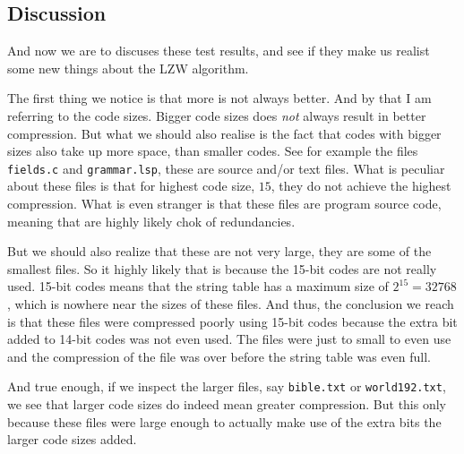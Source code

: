 \begin{refsection}
\subsection{Discussion}

And now we are to discuses these test results, and see if they make us
realist some new things about the LZW algorithm.

The first thing we notice is that more is not always better. And by
that I am referring to the code sizes. Bigger code sizes does
\textit{not} always result in better compression. But what we should
also realise is the fact that codes with bigger sizes also take up
more space, than smaller codes. See for example the files
\verb|fields.c| and \verb|grammar.lsp|, these are source and/or text
files. What is peculiar about these files is that for highest code
size, $15$, they do not achieve the highest compression. What is even
stranger is that these files are program source code, meaning that are
highly likely chok of redundancies.

But we should also realize that these are not very large, they are
some of the smallest files. So it highly likely that is because the
15-bit codes are not really used. 15-bit codes means that the string
table has a maximum size of $2^{15} = 32768$, which is nowhere near
the sizes of these files. And thus, the conclusion we reach is that
these files were compressed poorly using 15-bit codes because the
extra bit added to 14-bit codes was not even used. The files were just
to small to even use and the compression of the file was over before
the string table was even full.

And true enough, if we inspect the larger files, say \verb|bible.txt|
or \verb|world192.txt|, we see that larger code sizes do indeed mean
greater compression. But this only because these files were large
enough to actually make use of the extra bits the larger code sizes
added.

\FloatBarrier

\printbibliography[heading=subbibliography]

\end{refsection}

